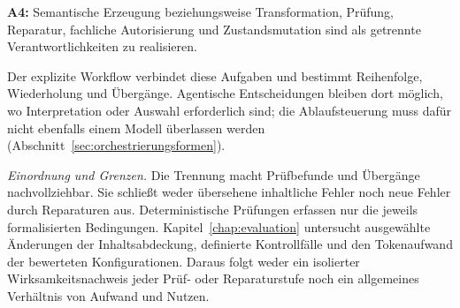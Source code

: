 \textbf{A4:} Semantische Erzeugung beziehungsweise Transformation,
Prüfung, Reparatur, fachliche Autorisierung und Zustandsmutation sind
als getrennte Verantwortlichkeiten zu realisieren.

Der explizite Workflow verbindet diese Aufgaben und bestimmt
Reihenfolge, Wiederholung und Übergänge. Agentische Entscheidungen
bleiben dort möglich, wo Interpretation oder Auswahl erforderlich
sind; die Ablaufsteuerung muss dafür nicht ebenfalls einem Modell
überlassen werden (Abschnitt~\ref{sec:orchestrierungsformen}).

\emph{Einordnung und Grenzen.} Die Trennung macht Prüfbefunde und
Übergänge nachvollziehbar. Sie schließt weder übersehene inhaltliche
Fehler noch neue Fehler durch Reparaturen aus. Deterministische
Prüfungen erfassen nur die jeweils formalisierten Bedingungen.
Kapitel~\ref{chap:evaluation} untersucht ausgewählte Änderungen der
Inhaltsabdeckung, definierte Kontrollfälle und den Tokenaufwand der
bewerteten Konfigurationen. Daraus folgt weder ein isolierter
Wirksamkeitsnachweis jeder Prüf- oder Reparaturstufe noch ein
allgemeines Verhältnis von Aufwand und Nutzen.
